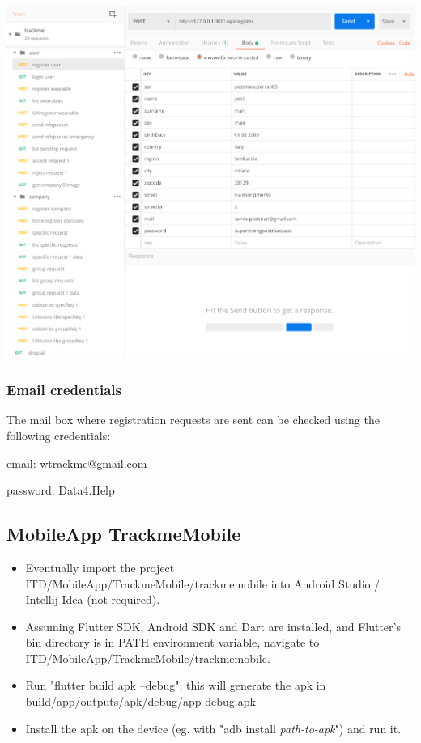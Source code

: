 \documentclass[../main.tex]{subfiles}
\begin{document}
\includegraphics[width = \linewidth ]{images/postman_screen.png}

\subsubsection{Email credentials}
The mail box where registration requests are sent can be checked using the following credentials:
\begin{description}
	\item email: wtrackme@gmail.com
	\item password: Data4.Help
\end{description}


\subsection{MobileApp TrackmeMobile}

\begin{itemize}
	\item Eventually import the project ITD/MobileApp/TrackmeMobile/trackmemobile into Android Studio / Intellij Idea (not required).
	\item Assuming Flutter SDK, Android SDK and Dart are installed, and Flutter's bin directory is in PATH environment variable, navigate to ITD/MobileApp/TrackmeMobile/trackmemobile.
	\item Run "flutter build apk --debug"; this will generate the apk in build/app/outputs/apk/debug/app-debug.apk
	\item Install the apk on the device (eg. with "adb install \textit{path-to-apk}") and run it.
\end{itemize}
\end{document}
